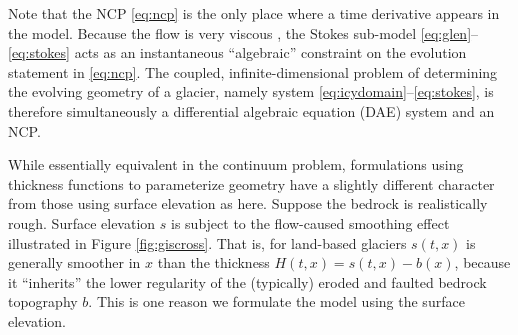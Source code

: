 \documentclass[hidelinks,onefignum,onetabnum,final]{siamart220329}  %
\begin{document}
Note that the NCP \eqref{eq:ncp} is the only place where a time derivative appears in the model.  Because the flow is very viscous \cite{Acheson1990}, the Stokes sub-model \eqref{eq:glen}--\eqref{eq:stokes} acts as an instantaneous ``algebraic'' constraint on the evolution statement in \eqref{eq:ncp}.  The coupled, infinite-dimensional problem of determining the evolving geometry of a glacier, namely system \eqref{eq:icydomain}--\eqref{eq:stokes}, is therefore simultaneously a differential algebraic equation (DAE) system \cite{AscherPetzold1998,LofgrenAhlkronaHelanow2022} and an NCP.

While essentially equivalent in the continuum problem, formulations using thickness functions to parameterize geometry have a slightly different character from those using surface elevation as here.  Suppose the bedrock is realistically rough.  Surface elevation $s$ is subject to the flow-caused smoothing effect illustrated in Figure \ref{fig:giscross}.  That is, for land-based glaciers $s(t,x)$ is generally smoother in $x$ than the thickness $H(t,x) = s(t,x)-b(x)$, because it ``inherits'' the lower regularity of the (typically) eroded and faulted bedrock topography $b$.  This is one reason we formulate the model using the surface elevation.
\end{document}
